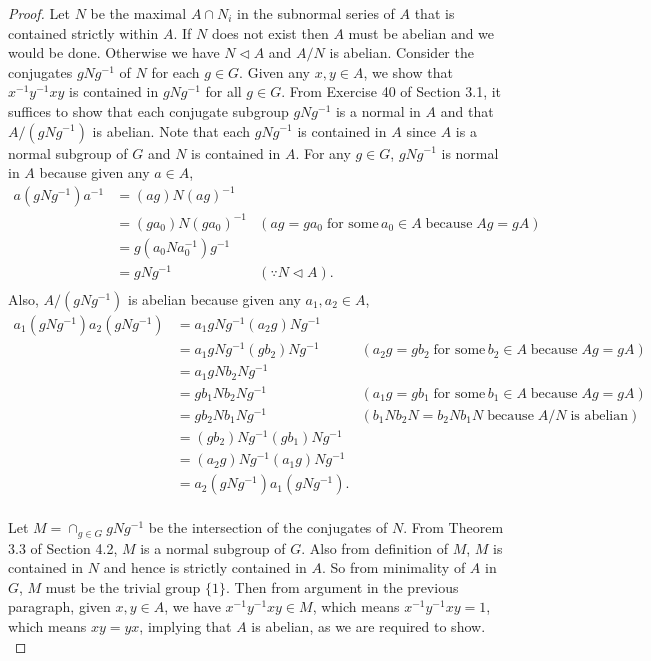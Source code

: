 \begin{proof}
  Let $N$ be the maximal $A\cap N_i$ in the subnormal series of $A$ that is
  contained strictly within $A$. If $N$ does not exist then $A$ must be
  abelian and we would be done. Otherwise we have $N\triangleleft A$ and
  $A/N$ is abelian. Consider the conjugates $gNg^{-1}$ of $N$ for each
  $g\in G$. Given any $x,y\in A$, we show that
  $x^{-1}y^{-1}xy$ is contained in $gNg^{-1}$ for all $g\in G$. From
  Exercise 40 of Section 3.1, it suffices to show that each conjugate
  subgroup $gNg^{-1}$ is a normal in $A$ and that $A/(gNg^{-1})$ is
  abelian. Note that each $gNg^{-1}$ is contained in $A$ since $A$ is a
  normal subgroup of $G$ and $N$ is contained in $A$.  For any $g\in G$,
  $gNg^{-1}$ is normal in $A$ because given any $a\in A$,
  \begin{align*}
    a(gNg^{-1})a^{-1} &= (ag)N(ag)^{-1} & \\
                      &= (ga_0)N(ga_0)^{-1} & (ag=ga_0\; \text{for some}\,
                      a_0\in A\; \text{because}\; Ag=gA) \\
                      &= g(a_0Na_0^{-1})g^{-1} & \\
                      &= gNg^{-1} & (\because N\triangleleft A). \\
  \end{align*}
  Also, $A/(gNg^{-1})$ is abelian because given any $a_1,a_2\in A$,
  \begin{align*}
    a_1(gNg^{-1})a_2(gNg^{-1})
                      &= a_1gNg^{-1}(a_2g)Ng^{-1} & \\
                      &= a_1gNg^{-1}(gb_2)Ng^{-1} & (a_2g=gb_2\; \text{for
                      some}\, b_2\in A\; \text{because}\; Ag=gA) \\
                      &= a_1gNb_2Ng^{-1} & \\
                      &= gb_1Nb_2Ng^{-1} & (a_1g=gb_1\; \text{for
                      some}\, b_1\in A\; \text{because}\; Ag=gA) \\
                      &= gb_2Nb_1Ng^{-1} & (b_1Nb_2N=b_2Nb_1N\;
                      \text{because}\; A/N\; \text{is abelian}) \\
                      &= (gb_2)Ng^{-1}(gb_1)Ng^{-1} & \\
                      &= (a_2g)Ng^{-1}(a_1g)Ng^{-1} & \\
                      &= a_2(gNg^{-1})a_1(gNg^{-1}). & \\
  \end{align*}

  Let $M=\cap_{g\in G}gNg^{-1}$ be the intersection of the conjugates of
  $N$. From Theorem 3.3 of Section 4.2, $M$ is a normal subgroup of $G$.
  Also from definition of $M$, $M$ is contained in $N$ and hence is
  strictly contained in $A$. So from minimality of $A$ in $G$, $M$ must be
  the trivial group $\{1\}$. Then from argument in the previous paragraph,
  given $x,y\in A$, we have $x^{-1}y^{-1}xy\in M$, which means
  $x^{-1}y^{-1}xy=1$, which means $xy=yx$, implying that $A$ is abelian, as
  we are required to show.  \\
\end{proof}
